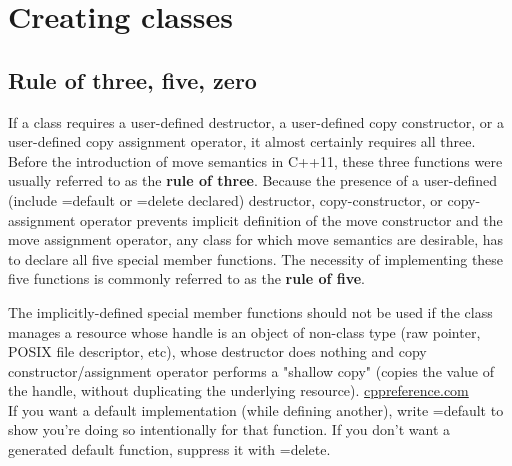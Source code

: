 \documentclass[a4paper,12pt,notitlepage]{article}
\begin{document}

\tableofcontents


\section{Creating classes}


\subsection{Rule of three, five, zero}


If a class requires a user-defined destructor, a user-defined copy constructor, or a user-defined
copy assignment operator, it almost certainly requires all three. Before the introduction of move
semantics in C++11, these three functions were usually referred to as the \textbf{rule of three}.
Because the presence of a user-defined (include =default or =delete declared) destructor, copy-constructor,
or copy-assignment operator prevents implicit definition of the move constructor and the move assignment
operator, any class for which move semantics are desirable, has to declare all five special member functions.
The necessity of implementing these five functions is commonly referred to as the \textbf{rule of five}.

The implicitly-defined special member functions should not be used if the class manages a resource
whose handle is an object of non-class type (raw pointer, POSIX file descriptor, etc), whose
destructor does nothing and copy constructor/assignment operator performs a "shallow copy" (copies
the value of the handle, without duplicating the underlying resource).
\href{https://en.cppreference.com/w/cpp/language/rule\_of\_three}{cppreference.com} \\
If you want a default implementation (while defining another), write =default to show you're doing
so intentionally for that function. If you don't want a generated default function, suppress it with
=delete. \\
\end{document}
